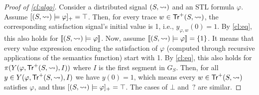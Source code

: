 \begin{proof}[\normalsize Proof of \cref{cl:algo}]
	\normalsize
	Consider a distributed signal $(S,{\rightsquigarrow})$ and an STL formula $\varphi$.
	Assume $[(S,{\rightsquigarrow}) \models \varphi]_+ = \top$.
	Then, for every trace $w \in \mathsf{Tr}^+(S,{\rightsquigarrow})$, the corresponding satisfaction signal's initial value is 1, i.e., $y_{\varphi,w}(0) = 1$.
	By \cref{cl:eq}, this also holds for $\llbracket (S, {\rightsquigarrow}) \models \varphi \rrbracket$.
	Now, assume  $\llbracket (S, {\rightsquigarrow}) \models \varphi \rrbracket = \{1\}$.
	It means that every value expression encoding the satisfaction of $\varphi$ (computed through recursive applications of the semantics function) start with 1.
	By \cref{cl:eq}, this also holds for $\pi(Y(\varphi, \mathsf{Tr}^+(S,{\rightsquigarrow}), I))$ where $I$ is the first segment in $G_S$.
	Then, for all $y \in Y(\varphi, \mathsf{Tr}^+(S,{\rightsquigarrow}), I)$ we have $y(0) = 1$, which means every $w \in \mathsf{Tr}^+(S,{\rightsquigarrow})$ satisfies $\varphi$, and thus $[(S,{\rightsquigarrow}) \models \varphi]_+ = \top$.
	The cases of $\bot$ and ${\,?}$ are similar.
\end{proof}

\egroup

